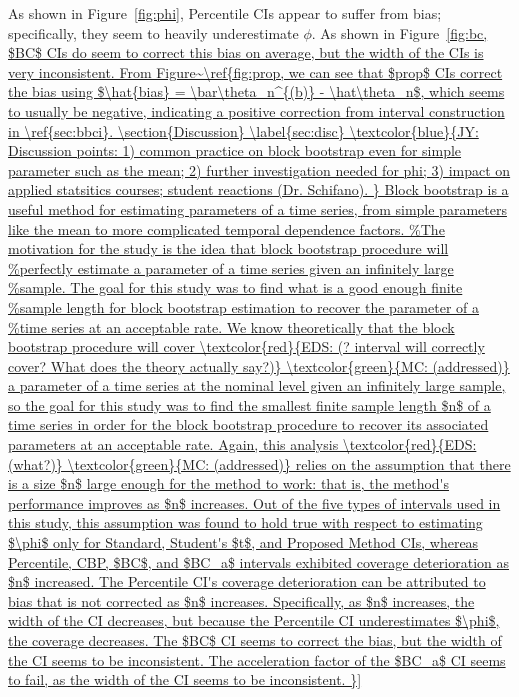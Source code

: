 \documentclass[12pt, letterpaper, titlepage]{article}
\newcommand{\jy}[1]{\textcolor{blue}{JY: #1}}
\newcommand{\eds}[1]{\textcolor{red}{EDS: (#1)}}
\newcommand{\mc}[1]{\textcolor{green}{MC: (#1)}}
\begin{document}
As shown in Figure~\ref{fig:phi}, Percentile CIs appear to suffer from bias; specifically, they seem to heavily underestimate $\phi$. As shown in Figure~\ref{fig:bc, $BC$ CIs do seem to correct this bias on average, but the width of the 
CIs is very inconsistent. From Figure~\ref{fig:prop, we can see that 
$prop$ CIs correct the bias using $\hat{bias} = \bar\theta_n^{(b)} - \hat\theta_n$, which seems to usually be negative, indicating a positive correction from
interval construction in \ref{sec:bbci}.

\section{Discussion}
\label{sec:disc}

\jy{Discussion points:
  1) common practice on block bootstrap even for simple parameter such as the
  mean;
  2) further investigation needed for phi;
  3) impact on applied statsitics courses; student reactions (Dr. Schifano).
}


Block bootstrap is a useful method for estimating parameters of a time
series, from simple parameters like the mean to more complicated temporal
 dependence factors.
 We know theoretically that the block bootstrap procedure will cover
 \eds{? interval will correctly cover?  What does the theory  actually say?}
 \mc{addressed} a
 parameter of a time series at the nominal level given an
 infinitely large
sample, so the goal for this study was to find the smallest finite
sample length $n$ of a time series in order for the block bootstrap procedure
to 
recover its associated parameters at an acceptable rate.

Again, this analysis \eds{what?} \mc{addressed} relies on the assumption that
there is a size $n$ large enough for the method to work: that is, the method's
performance improves as $n$ increases. Out of the five types of intervals used
in this study, this assumption was found to hold true with respect to
estimating $\phi$ only for Standard, Student's $t$, and Proposed Method CIs, whereas 
Percentile, CBP, $BC$, and $BC_a$ intervals exhibited coverage deterioration as $n$
increased. The Percentile CI's coverage deterioration can be attributed to
bias that is not corrected as $n$ increases. Specifically, as $n$ increases, 
the width of the CI decreases, but because the Percentile CI
underestimates $\phi$, the coverage decreases. The $BC$ CI seems to correct the bias, but the width of the CI seems to be inconsistent. The acceleration 
factor of the $BC_a$ CI seems to fail, as the width of the CI
seems to be inconsistent. 


}}
\end{document}
